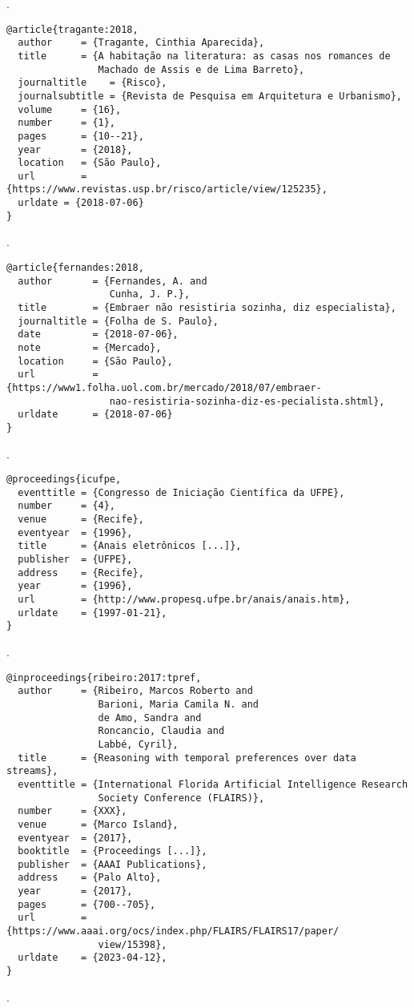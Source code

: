 \noindent
{}.

\vspace*{1em}

\begin{verbatim}
@article{tragante:2018,
  author     = {Tragante, Cinthia Aparecida},
  title      = {A habitação na literatura: as casas nos romances de
                Machado de Assis e de Lima Barreto},
  journaltitle    = {Risco},
  journalsubtitle = {Revista de Pesquisa em Arquitetura e Urbanismo},
  volume     = {16},
  number     = {1},
  pages      = {10--21},
  year       = {2018},
  location   = {São Paulo},
  url        = {https://www.revistas.usp.br/risco/article/view/125235},
  urldate = {2018-07-06}
}
\end{verbatim}

\noindent
{}.

\vspace*{1em}

\begin{verbatim}
@article{fernandes:2018,
  author       = {Fernandes, A. and
                  Cunha, J. P.},
  title        = {Embraer não resistiria sozinha, diz especialista},
  journaltitle = {Folha de S. Paulo},
  date         = {2018-07-06},
  note         = {Mercado},
  location     = {São Paulo},
  url          = {https://www1.folha.uol.com.br/mercado/2018/07/embraer-
                  nao-resistiria-sozinha-diz-es-pecialista.shtml},
  urldate      = {2018-07-06}
}
\end{verbatim}

\noindent
{}.

\vspace*{1em}

\begin{verbatim}
@proceedings{icufpe,
  eventtitle = {Congresso de Iniciação Científica da UFPE},
  number     = {4},
  venue      = {Recife},
  eventyear  = {1996},
  title      = {Anais eletrônicos [...]},
  publisher  = {UFPE},
  address    = {Recife},
  year       = {1996},
  url        = {http://www.propesq.ufpe.br/anais/anais.htm},
  urldate    = {1997-01-21},
}
\end{verbatim}

\noindent
{}.

\vspace*{1em}

\begin{verbatim}
@inproceedings{ribeiro:2017:tpref,
  author     = {Ribeiro, Marcos Roberto and
                Barioni, Maria Camila N. and
                de Amo, Sandra and
                Roncancio, Claudia and
                Labbé, Cyril},
  title      = {Reasoning with temporal preferences over data streams},
  eventtitle = {International Florida Artificial Intelligence Research
                Society Conference (FLAIRS)},
  number     = {XXX},
  venue      = {Marco Island},
  eventyear  = {2017},
  booktitle  = {Proceedings [...]},
  publisher  = {AAAI Publications},
  address    = {Palo Alto},
  year       = {2017},
  pages      = {700--705},
  url        = {https://www.aaai.org/ocs/index.php/FLAIRS/FLAIRS17/paper/
                view/15398},
  urldate    = {2023-04-12},
}
\end{verbatim}

\noindent
{}.
